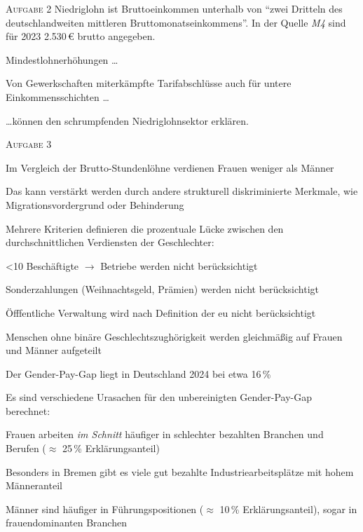 \textsc{Aufgabe 2} \quad
Niedriglohn ist Bruttoeinkommen unterhalb von \enquote{zwei Dritteln des deutschlandweiten mittleren Bruttomonatseinkommens}.
In der Quelle \emph{M4} sind für 2023 2.530\,€ brutto angegeben. 

\begin{myitemize}
    \item Mindestlohnerhöhungen \dots
    \item Von Gewerkschaften miterkämpfte Tarifabschlüsse auch für untere Einkommensschichten \dots
\end{myitemize}
\dots können den schrumpfenden Niedriglohnsektor erklären. 
\bigskip

\textsc{Aufgabe 3} \quad
\begin{myitemize}
    \item Im Vergleich der Brutto-Stundenlöhne verdienen Frauen weniger als Männer
    \item Das kann verstärkt werden durch andere strukturell diskriminierte Merkmale, wie Migrationsvordergrund oder Behinderung 
    \item Mehrere Kriterien definieren die prozentuale Lücke zwischen den durchschnittlichen Verdiensten der Geschlechter:
    \begin{myitemize}
        \item <10 Beschäftigte $\rightarrow$ Betriebe werden nicht berücksichtigt
        \item Sonderzahlungen (Weihnachtsgeld, Prämien) werden nicht berücksichtigt
        \item Öfffentliche Verwaltung wird nach Definition der \gls{eu} nicht berücksichtigt
        \item Menschen ohne binäre Geschlechtszughörigkeit werden gleichmäßig auf Frauen und Männer aufgeteilt
    \end{myitemize}
    \item Der Gender-Pay-Gap liegt in Deutschland 2024 bei etwa 16\,\%
    \item Es sind verschiedene Urasachen für den unbereinigten Gender-Pay-Gap berechnet:
    \begin{myitemize}
        \item Frauen arbeiten \emph{im Schnitt} häufiger in schlechter bezahlten Branchen und Berufen ($\approx$ 25\,\% Erklärungsanteil)
        \item Besonders in Bremen gibt es viele gut bezahlte Industriearbeitsplätze mit hohem Männeranteil
        \item Männer sind häufiger in Führungspositionen ($\approx$ 10\,\% Erklärungsanteil), sogar in frauendominanten Branchen

\end{myitemize}
\end{myitemize}
